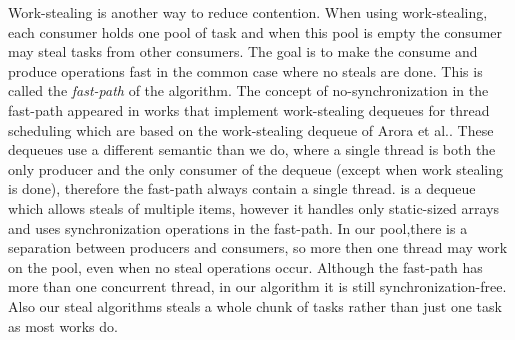 Work-stealing is another way to reduce contention. When using work-stealing, each consumer holds
one pool of task and when this pool is empty the consumer may steal tasks from other
consumers. The goal is to make the consume and produce operations fast in the common case where no
steals are done. This is called the \emph{fast-path} of the algorithm. The concept
of no-synchronization in the fast-path appeared in works that implement work-stealing dequeues for
thread scheduling which are based on the work-stealing dequeue of Arora et
al.\cite{Arora:1998:TSM:277651.277678}. These dequeues use a different semantic than we do, 
where a single thread is both the only producer and the only consumer of the dequeue (except when
work stealing is done), therefore the fast-path always contain a single
thread. \cite{Hendler:2002:NSW:571825.571876} is a dequeue which allows steals of multiple items,
however it handles only static-sized arrays and uses synchronization operations in the fast-path. 
In our pool,there is a separation between producers and consumers, so more then one thread may work
on the pool, even when no steal operations occur. Although the fast-path has more than one
concurrent thread, in our algorithm it is still synchronization-free. Also our steal
algorithms steals a whole chunk of tasks rather than just one task as most works do.